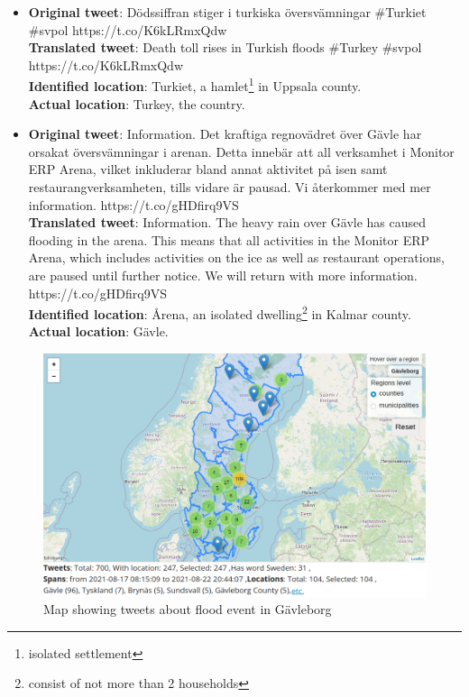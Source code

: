 \begin{itemize}
  \item \textbf{Original tweet}: Dödssiffran stiger i turkiska översvämningar \#Turkiet \#svpol
    https://t.co/K6kLRmxQdw \\
  \textbf{Translated tweet}: Death toll rises in Turkish floods \#Turkey \#svpol \\
    https://t.co/K6kLRmxQdw \\
    \textbf{Identified location}: Turkiet, a hamlet\footnote{isolated settlement} in Uppsala county. \\
    \textbf{Actual location}: Turkey, the country.

  \item \textbf{Original tweet}: Information. Det kraftiga regnovädret över Gävle har orsakat
    översvämningar i arenan. Detta innebär att all verksamhet i Monitor ERP Arena, vilket inkluderar
    bland annat aktivitet på isen samt restaurangverksamheten, tills vidare är pausad. Vi återkommer
    med mer information. https://t.co/gHDfirq9VS \\
    \textbf{Translated tweet}: Information. The heavy rain over Gävle has caused flooding in the arena.
    This means that all activities in the Monitor ERP Arena, which includes activities on the ice as
    well as restaurant operations, are paused until further notice. We will return with more
    information. https://t.co/gHDfirq9VS \\
    \textbf{Identified location}: Årena, an isolated dwelling\footnote{consist of not more than 2 households}
    in Kalmar county. \\
    \textbf{Actual location}: Gävle.


\end{itemize}

\begin{figure}[H]
  \begin{center}
    \includegraphics[width=14cm]{./images/gavle_map.png}
  \end{center}
  \caption{Map showing tweets about flood event in Gävleborg}
  \label{fig:gavle_map}
\end{figure}

